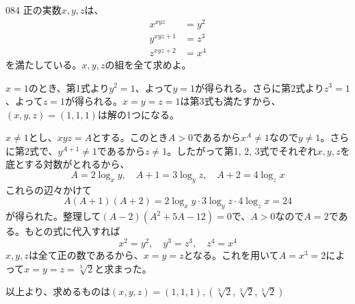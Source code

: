 \begin{prob}{084}{\maru}{}
 正の実数$x, y, z$は、
 \begin{align*}
  x^{xyz}&=y^2 \\
  y^{xyz+1}&=z^3 \\
  z^{xyz+2}&=x^4
 \end{align*}
 を満たしている。$x, y, z$の組を全て求めよ。
\end{prob}
$x=1$のとき、第1式より$y^2=1$、よって$y=1$が得られる。さらに第2式より$z^3=1$、よって$z=1$が得られる。$x=y=z=1$は第3式も満たすから、$(x, y, z)=(1, 1, 1)$は解の1つになる。

$x\neq 1$とし、$xyz=A$とする。このとき$A>0$であるから$x^A\neq 1$なので$y\neq 1$。さらに第2式で、$y^{A+1}\neq 1$であるから$z\neq 1$。したがって第1, 2, 3式でそれぞれ$x, y, z$を底とする対数がとれるから、
\[ A=2\log_x{y},\quad A+1=3\log_y{z},\quad A+2=4\log_z{x} \]
これらの辺々かけて
\[ A(A+1)(A+2)=2\log_x{y}\cdot 3\log_y{z}\cdot 4\log_z{x} = 24 \]
が得られた。整理して$(A-2)(A^2+5A-12)=0$で、$A>0$なので$A=2$である。もとの式に代入すれば
\[ x^2=y^2,\quad y^3=z^3,\quad z^4=x^4 \]
$x, y, z$は全て正の数であるから、$x=y=z$となる。これを用いて$A=x^3=2$によって$x=y=z=\sqrt[3]{2}$と求まった。

以上より、求めるものは$(x, y, z)=(1, 1, 1), (\sqrt[3]{2}, \sqrt[3]{2}, \sqrt[3]{2})$